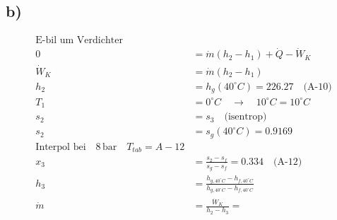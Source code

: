 

\subsection*{b)}

\begin{align*}
\text{E-bil um Verdichter} \\
0 &= \dot{m} (h_2 - h_1) + \dot{Q} - \dot{W}_K \\
\dot{W}_K &= \dot{m} (h_2 - h_1) \\
h_2 &= h_g (40^\circ C) = 226.27 \quad \text{(A-10)} \\
T_1 &= 0^\circ C \quad \rightarrow \quad 10^\circ C = 10^\circ C \\
s_2 &= s_3 \quad \text{(isentrop)} \\
s_2 &= s_g (40^\circ C) = 0.9169 \\
\text{Interpol bei} \quad 8 \, \text{bar} \quad T_{tab} = A-12 \\
x_3 &= \frac{s_2 - s_f}{s_g - s_f} = 0.334 \quad \text{(A-12)} \\
h_3 &= \frac{h_{g,40^\circ C} - h_{f,40^\circ C}}{h_{g,40^\circ C} - h_{f,40^\circ C}} \\
\dot{m} &= \frac{\dot{W}_K}{h_2 - h_3} = 
\end{align*}